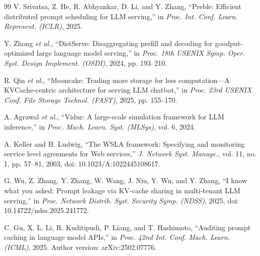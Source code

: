 \begin{thebibliography}{99}
V. Srivatsa, Z. He, R. Abhyankar, D. Li, and Y. Zhang, ``Preble: Efficient distributed prompt scheduling for LLM serving,'' in \emph{Proc. Int. Conf. Learn. Represent. (ICLR)}, 2025.

Y. Zhong \emph{et al.}, ``DistServe: Disaggregating prefill and decoding for goodput-optimized large language model serving,'' in \emph{Proc. 18th USENIX Symp. Oper. Syst. Design Implement. (OSDI)}, 2024, pp. 193--210.

R. Qin \emph{et al.}, ``Mooncake: Trading more storage for less computation---A KVCache-centric architecture for serving LLM chatbot,'' in \emph{Proc. 23rd USENIX Conf. File Storage Technol. (FAST)}, 2025, pp. 155--170.

A. Agrawal \emph{et al.}, ``Vidur: A large-scale simulation framework for LLM inference,'' in \emph{Proc. Mach. Learn. Syst. (MLSys)}, vol. 6, 2024.

A. Keller and H. Ludwig, ``The WSLA framework: Specifying and monitoring service level agreements for Web services,'' \emph{J. Network Syst. Manage.}, vol. 11, no. 1, pp. 57--81, 2003, doi: 10.1023/A:1022445108617.

G. Wu, Z. Zhang, Y. Zhang, W. Wang, J. Niu, Y. Wu, and Y. Zhang, ``I know what you asked: Prompt leakage via KV-cache sharing in multi-tenant LLM serving,'' in \emph{Proc. Network Distrib. Syst. Security Symp. (NDSS)}, 2025, doi: 10.14722/ndss.2025.241772.

C. Gu, X. L. Li, R. Kuditipudi, P. Liang, and T. Hashimoto, ``Auditing prompt caching in language model APIs,'' in \emph{Proc. 42nd Int. Conf. Mach. Learn. (ICML)}, 2025. Author version: arXiv:2502.07776.

\end{thebibliography}
